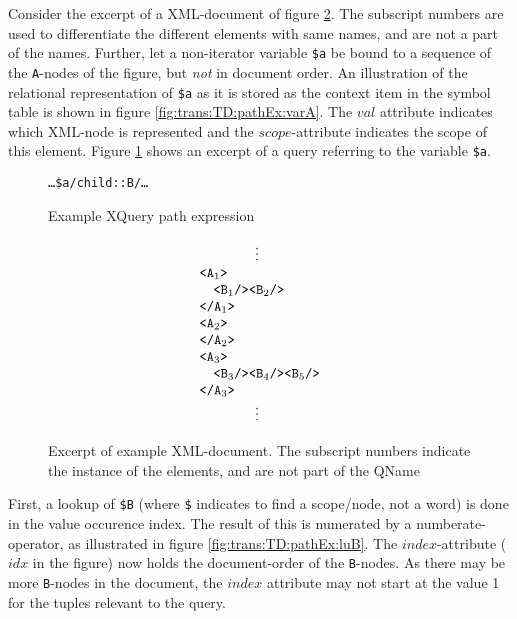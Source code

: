\begin{myExample}
Consider the excerpt of a XML-document of figure \ref{fig:trans:TD:pathExXml}.
The subscript numbers are used to differentiate the different elements with same names, and are not a part of the names. Further, let a non-iterator
variable \texttt{\$a} be bound to a sequence of the \texttt{A}-nodes of the figure, but \emph{not} in document
order. An illustration of the relational representation of \texttt{\$a} as it is stored as the context item in the
symbol table is shown in figure \ref{fig:trans:TD:pathEx:varA}. The $val$ attribute indicates which XML-node is
represented and the $scope$-attribute indicates the scope of this element. Figure \ref{fig:trans:TD:pathQu} shows
an excerpt of a query referring to the variable \texttt{\$a}. \begin{figure}[h!]
\centering
\texttt{\ldots\$a/child::B/\ldots}
\caption{Example XQuery path expression \label{fig:trans:TD:pathQu}}
\end{figure} 

\begin{figure}[h]
\centering
\begin{equation*}
\begin{array}{l}
\qquad \qquad \vdots \\
\mbox{\texttt{<A}}_{1}\mbox{\texttt{>}} \\ \quad
\mbox{\texttt{<B}}_{1}\mbox{\texttt{/>}}\mbox{\texttt{<B}}_{2}\mbox{\texttt{/>}} \\
\mbox{\texttt{</A}}_{1}\mbox{\texttt{>}} \\
\mbox{\texttt{<A}}_{2}\mbox{\texttt{>}} \\ 
\mbox{\texttt{</A}}_{2}\mbox{\texttt{>}} \\
\mbox{\texttt{<A}}_{3}\mbox{\texttt{>}} \\ \quad
\mbox{\texttt{<B}}_{3}\mbox{\texttt{/>}}\mbox{\texttt{<B}}_{4}\mbox{\texttt{/>}}\mbox{\texttt{<B}}_{5}\mbox{\texttt{/>}}
\\ \mbox{\texttt{</A}}_{3}\mbox{\texttt{>}} \\
\qquad \qquad \vdots
\end{array}
\end{equation*}
\caption[Excerpt of example XML-document.]{Excerpt of example XML-document. The
subscript numbers indicate the instance of the elements, and are not part of the QName \label{fig:trans:TD:pathExXml}}
\end{figure}

First, a lookup of \texttt{\$B} (where \texttt{\$} indicates to find a scope/node, not a word) is done in the
value occurence index. The result of this is numerated by a \textsf{numberate}-operator, as illustrated in figure
\ref{fig:trans:TD:pathEx:luB}. The $index$-attribute ($idx$ in the figure) now holds the document-order of the
\texttt{B}-nodes. As there may be more \texttt{B}-nodes in the document, the $index$ attribute may not start
at the value 1 for the tuples relevant to the query.


\end{myExample}
